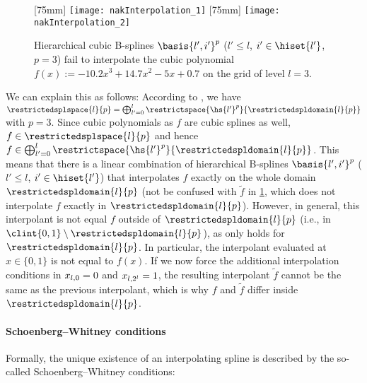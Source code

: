 \begin{figure}
  [75mm]{%
    \texttt{[image: nakInterpolation\_1]}%
  }%
  \hfill%
  [75mm]{%
    \texttt{[image: nakInterpolation\_2]}%
  }%
  \caption{%
    Hierarchical cubic B-splines $\basis{l',i'}^p$
    ($l' \le l$, $i' \in \hiset{l'}$, $p = 3$)
    fail to interpolate the cubic polynomial
    $f(x) := -10.2 x^3 + 14.7 x^2 - 5x + 0.7$
    on the grid of level $l = 3$.%
  }
  \label{fig:nakInterpolation}
\end{figure}

We can explain this as follows:
According to ,
we have $\restrictedsplspace{l}{p} = \bigoplus_{l'=0}^l \restrictspace{\hs{l'}^p}{\restrictedspldomain{l}{p}}$
with $p = 3$.
Since cubic polynomials as $f$ are cubic splines as well,
$f \in \restrictedsplspace{l}{p}$ and hence
$f \in \bigoplus_{l'=0}^l \restrictspace{\hs{l'}^p}{\restrictedspldomain{l}{p}}$.
This means that there is a linear combination of hierarchical B-splines
$\basis{l',i'}^p$ ($l' \le l$, $i' \in \hiset{l'}$)
that interpolates $f$ exactly on the whole domain $\restrictedspldomain{l}{p}$
(not be confused with $\tilde{f}$ in \cref{fig:nakInterpolation},
which does not interpolate $f$ exactly in $\restrictedspldomain{l}{p}$).
However, in general, this interpolant is not equal $f$ outside
of $\restrictedspldomain{l}{p}$ (i.e., in $\clint{0, 1} \setminus \restrictedspldomain{l}{p}$),
as  only holds for $\restrictedspldomain{l}{p}$.
In particular, the interpolant evaluated at $x \in \{0, 1\}$ is not
equal to $f(x)$.
If we now force the additional interpolation conditions in
$x_{l,0} = 0$ and $x_{l,2^l} = 1$,
the resulting interpolant $\tilde{f}$ cannot be the same as the previous
interpolant,
which is why $f$ and $\tilde{f}$ differ inside $\restrictedspldomain{l}{p}$.

\paragraph{Schoenberg--Whitney conditions}

Formally, the unique existence of an interpolating spline is
described by the so-called Schoenberg--Whitney conditions:

